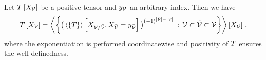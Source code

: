 

\begin{lemma}\label{the:contractionFactorization}
	Let $T\left[X_{\mathcal{V}}\right]$ be a positive tensor and $y_{\mathcal{V}}$ an arbitrary index.
	Then we have 
	\begin{align*}
		T\left[X_{\mathcal{V}}\right]
		= \left\langle \left\{
			\big(\left\langle \left\{T\right\}\right\rangle \left[ X_{\mathcal{V}/\bar{\mathcal{V}}}, X_{\bar{\mathcal{V}}} = y_{\bar{\mathcal{V}}} \right]\big)^{(-1)^{\left|\tilde{\mathcal{V}}\right|-\left|\bar{\mathcal{V}}\right|}} \, : \, \bar{\mathcal{V}} \subset \tilde{\mathcal{V}} \subset \mathcal{V}
		\right\}\right\rangle \left[ X_{\mathcal{V}} \right] \, ,
	\end{align*}
	where the exponentiation is performed coordinatewise and positivity of $T$ ensures the well-definedness.
\end{lemma}
